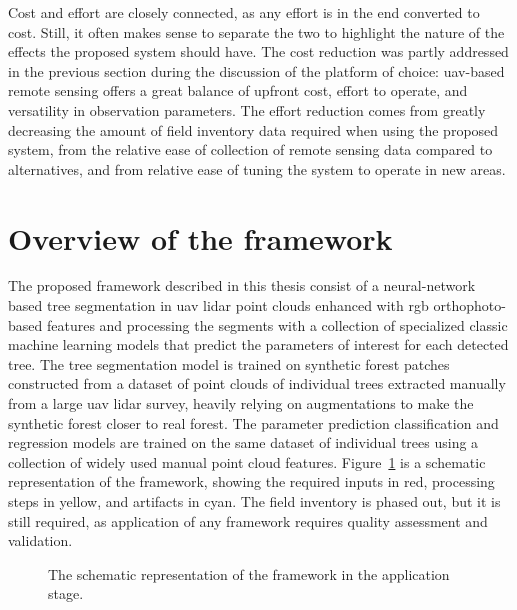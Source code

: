 Cost and effort are closely connected, as any effort is in the end converted to cost.
Still, it often makes sense to separate the two to highlight the nature of the effects the proposed system should have.
The cost reduction was partly addressed in the previous section during the discussion of the platform of choice: \gls{uav}-based remote sensing offers a great balance of upfront cost, effort to operate, and versatility in observation parameters.
The effort reduction comes from greatly decreasing the amount of field inventory data required when using the proposed system, from the relative ease of collection of remote sensing data compared to alternatives, and from relative ease of tuning the system to operate in new areas.

\section{Overview of the framework}

The proposed framework described in this thesis consist of a neural-network based tree segmentation in \gls{uav} \gls{lidar} point clouds enhanced with \gls{rgb} orthophoto-based features and processing the segments with a collection of specialized classic machine learning models that predict the parameters of interest for each detected tree.
The tree segmentation model is trained on synthetic forest patches constructed from a dataset of point clouds of individual trees extracted manually from a large \gls{uav} \gls{lidar} survey, heavily relying on augmentations to make the synthetic forest closer to real forest.
The parameter prediction classification and regression models are trained on the same dataset of individual trees using a collection of widely used manual point cloud features.
Figure~\ref{fig-framework-apply} is a schematic representation of the framework, showing the required inputs in red, processing steps in yellow, and artifacts in cyan.
The field inventory is phased out, but it is still required, as application of any framework requires quality assessment and validation.

\begin{figure}
\caption[Schematic representation of the framework: application]{\label{fig-framework-apply}The schematic representation of the
framework in the application stage.}
\end{figure}

